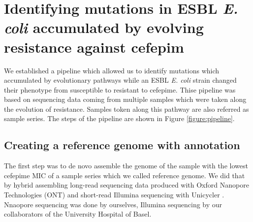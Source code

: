 \section{Identifying mutations in ESBL \textit{E. coli} accumulated by evolving resistance against cefepim}
We established a pipeline which allowed us to identify mutations which accumulated by evolutionary pathways while an ESBL \textit{E. coli} strain changed their phenotype from susceptible to resistant to cefepime. Thise pipeline was based on sequencing data coming from multiple samples which were taken along the evolution of resistance. Samples token along this pathway are also referred as sample series. The steps of the pipeline are shown in Figure \ref{figure:pipeline}.

\subsection{Creating a reference genome with annotation} 
The first step was to de novo assemble the genome of the sample with the lowest cefepime MIC of a sample series which we called reference genome. We did that by hybrid assembling long-read sequencing data produced with Oxford Nanopore Technologies (ONT) and short-read Illumina sequencing with Unicycler \cite{wick_unicycler:_2017}. Nnaopore sequencing was done by ourselves, Illumina sequencing by our collaborators of the University Hospital of Basel.  

